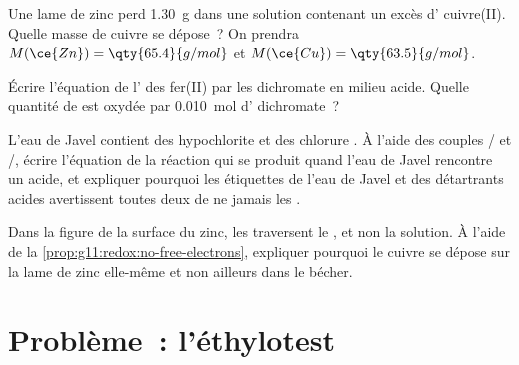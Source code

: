 \begin{exercise}[$\star\star\star$]\label{exo:g11:redox:12}
Une lame de zinc perd \qty{1.30}{g} dans une solution contenant un excès
d' cuivre(II). Quelle masse de cuivre se dépose~? On prendra
$M(\ce{Zn}) = \qty{65.4}{g/mol}$ et $M(\ce{Cu}) = \qty{63.5}{g/mol}$.
\end{exercise}

\begin{exercise}[$\star\star\star$]\label{exo:g11:redox:13}
Écrire l'équation de l' des  fer(II) par les 
dichromate en milieu acide. Quelle quantité de  est oxydée
par \qty{0.010}{mol} d' dichromate~?
\end{exercise}

\begin{exercise}[$\star\star\star$]\label{exo:g11:redox:14}
L'eau de Javel contient des  hypochlorite  et des 
chlorure . À l'aide des couples / et
/, écrire l'équation de la réaction qui se produit quand
l'eau de Javel rencontre un acide, et expliquer pourquoi les étiquettes
de l'eau de Javel et des détartrants acides avertissent toutes deux de
ne jamais les .
\end{exercise}

\begin{exercise}[$\star\star\star$]\label{exo:g11:redox:15}
Dans la figure de la surface du zinc, les  traversent le ,
et non la solution. À l'aide de la
\cref{prop:g11:redox:no-free-electrons}, expliquer pourquoi le cuivre se
dépose sur la lame de zinc elle-même et non ailleurs dans le bécher.
\end{exercise}

\section{Problème~: l'éthylotest}

